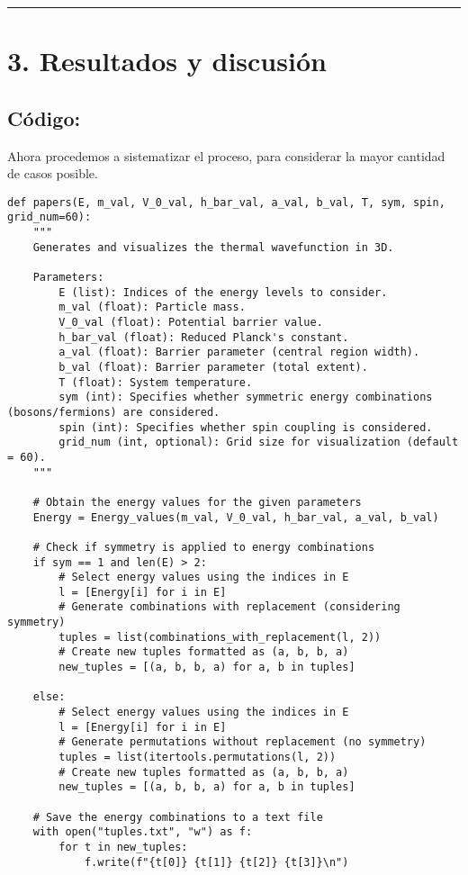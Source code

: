 \documentclass[11pt]{article}
\begin{document}
\noindent\rule{\textwidth}{0.5pt}
\section{\textbf{3. Resultados y discusión}}
\label{sec:orgf274049}
\subsection{Código:}
\label{sec:org318b16f}
Ahora procedemos a sistematizar el proceso, para considerar la mayor cantidad de
casos posible.
\begin{verbatim}
def papers(E, m_val, V_0_val, h_bar_val, a_val, b_val, T, sym, spin, grid_num=60):
    """
    Generates and visualizes the thermal wavefunction in 3D.

    Parameters:
        E (list): Indices of the energy levels to consider.
        m_val (float): Particle mass.
        V_0_val (float): Potential barrier value.
        h_bar_val (float): Reduced Planck's constant.
        a_val (float): Barrier parameter (central region width).
        b_val (float): Barrier parameter (total extent).
        T (float): System temperature.
        sym (int): Specifies whether symmetric energy combinations (bosons/fermions) are considered.
        spin (int): Specifies whether spin coupling is considered.
        grid_num (int, optional): Grid size for visualization (default = 60).
    """

    # Obtain the energy values for the given parameters
    Energy = Energy_values(m_val, V_0_val, h_bar_val, a_val, b_val)

    # Check if symmetry is applied to energy combinations
    if sym == 1 and len(E) > 2:
        # Select energy values using the indices in E
        l = [Energy[i] for i in E]
        # Generate combinations with replacement (considering symmetry)
        tuples = list(combinations_with_replacement(l, 2))
        # Create new tuples formatted as (a, b, b, a)
        new_tuples = [(a, b, b, a) for a, b in tuples]

    else:
        # Select energy values using the indices in E
        l = [Energy[i] for i in E]
        # Generate permutations without replacement (no symmetry)
        tuples = list(itertools.permutations(l, 2))
        # Create new tuples formatted as (a, b, b, a)
        new_tuples = [(a, b, b, a) for a, b in tuples]

    # Save the energy combinations to a text file
    with open("tuples.txt", "w") as f:
        for t in new_tuples:
            f.write(f"{t[0]} {t[1]} {t[2]} {t[3]}\n")


\end{verbatim}
\end{document}
